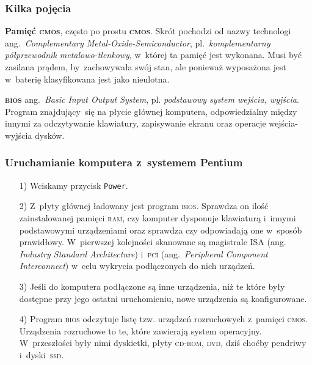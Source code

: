 \documentclass[10pt,t]{beamer}
\begin{document}
\begin{frame}
  \frametitle{Kilka pojęcia}


  \textbf{Pamięć \textsc{cmos}}, często po prostu \textbf{\textsc{cmos}}.
  Skrót pochodzi od nazwy technologi ang.~\textit{Complementary
    Metal-Oxide-Semiconductor}, pl.~\textit{komplementarny półprzewodnik
    metalowo-tlenkowy}, w~której ta pamięć jest wykonana. Musi być zasilana
  prądem, by~zachowywała swój stan, ale ponieważ wyposażona jest w~baterię
  klasyfikowana jest jako nieulotna.

  \textbf{\textsc{bios}} ang.~\textit{Basic Input Output System}, pl.
  \textit{podstawowy system wejścia, wyjścia}. Program znajdujący~się
  na płycie głównej komputera, odpowiedzialny między innymi za odczytywanie
  klawiatury, zapisywanie ekranu oraz operacje wejścia-wyjścia dysków.

\end{frame}





\begin{frame}
  \frametitle{Uruchamianie komputera z~systemem Pentium}


  \begin{itemize}

  \item[1)] Wciskamy przycisk \texttt{Power}.

  \item[2)] Z~płyty głównej ładowany jest program \textsc{bios}. Sprawdza on
    ilość zainstalowanej pamięci \textsc{ram}, czy komputer dysponuje
    klawiaturą i~innymi podstawowymi urządzeniami oraz sprawdza czy
    odpowiadają one w~sposób prawidłowy. W~pierwszej kolejności skanowane
    są magistrale \textsc{ISA} (ang. \textit{Industry Standard
      Architecture}) i~\textsc{pci} (ang.~\textit{Peripheral Component
      Interconnect}) w~celu wykrycia podłączonych do nich urządzeń.

  \item[3)] Jeśli do komputera podłączone są inne urządzenia, niż te które
    były dostępne przy jego ostatni uruchomieniu, nowe urządzenia są
    konfigurowane.

  \item[4)] Program \textsc{bios} odczytuje listę tzw. urządzeń rozruchowych
    z~pamięci \textsc{cmos}. Urządzenia rozruchowe to te, które zawierają
    system operacyjny. W~przeszłości były nimi dyskietki, płyty
    \textsc{cd}-\textsc{rom}, \textsc{dvd}, dziś choćby pendriwy
    i~dyski~\textsc{ssd}.

  \end{itemize}

\end{frame}
\end{document}
